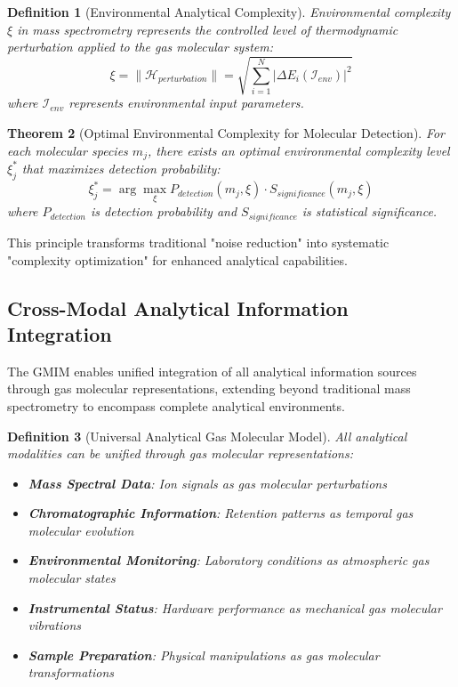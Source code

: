 \documentclass[11pt,a4paper]{article}
\newtheorem{theorem}{Theorem}[section]
\newtheorem{definition}[theorem]{Definition}
\theoremstyle{remark}
\begin{document}
\begin{definition}[Environmental Analytical Complexity]
Environmental complexity $\xi$ in mass spectrometry represents the controlled level of thermodynamic perturbation applied to the gas molecular system:
$$\xi = \|\mathcal{H}_{perturbation}\| = \sqrt{\sum_{i=1}^{N} \left|\Delta E_i(\mathcal{I}_{env})\right|^2}$$
where $\mathcal{I}_{env}$ represents environmental input parameters.
\end{definition}

\begin{theorem}[Optimal Environmental Complexity for Molecular Detection]
For each molecular species $m_j$, there exists an optimal environmental complexity level $\xi_j^*$ that maximizes detection probability:
$$\xi_j^* = \arg\max_\xi P_{detection}(m_j, \xi) \cdot S_{significance}(m_j, \xi)$$
where $P_{detection}$ is detection probability and $S_{significance}$ is statistical significance.
\end{theorem}

This principle transforms traditional "noise reduction" into systematic "complexity optimization" for enhanced analytical capabilities.

\subsection{Cross-Modal Analytical Information Integration}

The GMIM enables unified integration of all analytical information sources through gas molecular representations, extending beyond traditional mass spectrometry to encompass complete analytical environments.

\begin{definition}[Universal Analytical Gas Molecular Model]
All analytical modalities can be unified through gas molecular representations:
\begin{itemize}
\item \textbf{Mass Spectral Data}: Ion signals as gas molecular perturbations
\item \textbf{Chromatographic Information}: Retention patterns as temporal gas molecular evolution
\item \textbf{Environmental Monitoring}: Laboratory conditions as atmospheric gas molecular states
\item \textbf{Instrumental Status}: Hardware performance as mechanical gas molecular vibrations
\item \textbf{Sample Preparation}: Physical manipulations as gas molecular transformations
\end{itemize}
\end{definition}
\end{document}
